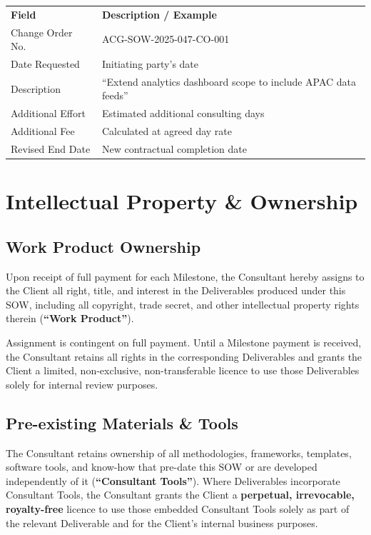 \vspace{6pt}
\begin{milestonebox}
\begin{tabular}{@{} L{3.5cm} L{8cm} @{}}
  \textbf{Field} & \textbf{Description / Example} \\[2pt]
  Change Order No.\ & ACG-SOW-2025-047-CO-001 \\
  Date Requested    & Initiating party's date \\
  Description       & ``Extend analytics dashboard scope to include APAC data feeds'' \\
  Additional Effort & Estimated additional consulting days \\
  Additional Fee    & Calculated at agreed day rate \\
  Revised End Date  & New contractual completion date \\
\end{tabular}
\end{milestonebox}

\section{Intellectual Property \& Ownership}
\label{sec:ip}

\subsection{Work Product Ownership}

Upon receipt of full payment for each Milestone, the Consultant hereby assigns to the
Client all right, title, and interest in the Deliverables produced under this SOW,
including all copyright, trade secret, and other intellectual property rights therein
(\textbf{``Work Product''}).

Assignment is contingent on full payment. Until a Milestone payment is received, the
Consultant retains all rights in the corresponding Deliverables and grants the Client
a limited, non-exclusive, non-transferable licence to use those Deliverables solely for
internal review purposes.

\subsection{Pre-existing Materials \& Tools}

The Consultant retains ownership of all methodologies, frameworks, templates, software
tools, and know-how that pre-date this SOW or are developed independently of it
(\textbf{``Consultant Tools''}). Where Deliverables incorporate Consultant Tools, the
Consultant grants the Client a \textbf{perpetual, irrevocable, royalty-free} licence to
use those embedded Consultant Tools solely as part of the relevant Deliverable and for
the Client's internal business purposes.

